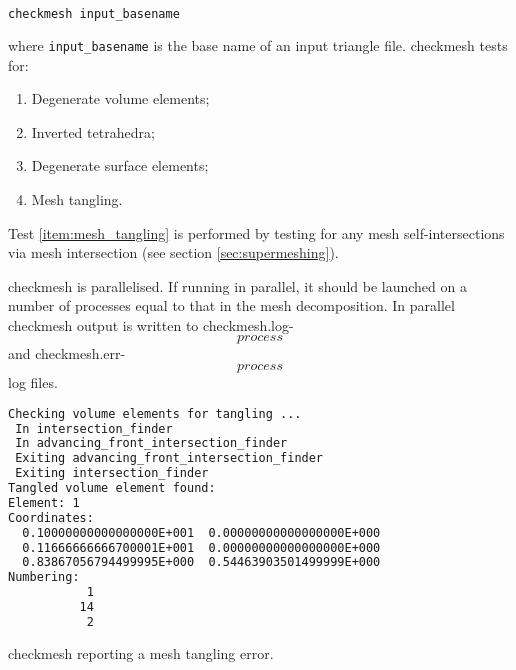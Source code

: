 \begin{lstlisting}[language = Bash]
checkmesh input_basename
\end{lstlisting}

where \lstinline[language = Bash]*input_basename* is the base name of an input
triangle file. checkmesh tests for:

\begin{enumerate}
  \item Degenerate volume elements;
  \item Inverted tetrahedra;
  \item Degenerate surface elements;
  \item\label{item:mesh_tangling} Mesh tangling.
\end{enumerate}

Test \ref{item:mesh_tangling} is performed by testing for any mesh self-intersections
via mesh intersection (see section \ref{sec:supermeshing}).

checkmesh is parallelised. If running in parallel, it should be launched on a number
of processes equal to that in the mesh decomposition. In parallel checkmesh output
is written to checkmesh.log-\[process\] and checkmesh.err-\[process\] log files.

\begin{example}
\begin{lstlisting}[language = Bash]
Checking volume elements for tangling ...
 In intersection_finder
 In advancing_front_intersection_finder
 Exiting advancing_front_intersection_finder
 Exiting intersection_finder
Tangled volume element found: 
Element: 1
Coordinates:
  0.10000000000000000E+001  0.00000000000000000E+000
  0.11666666666700001E+001  0.00000000000000000E+000
  0.83867056794499995E+000  0.54463903501499999E+000
Numbering:
           1
          14
           2
\end{lstlisting}
\caption{checkmesh reporting a mesh tangling error.}
\end{example}
